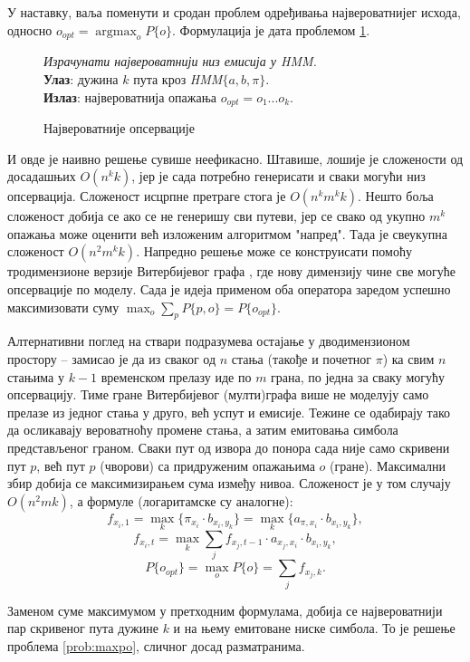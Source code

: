 \documentclass[12pt,oneside]{memoir}
\newenvironment{problem}[1][!ht]
{\renewcommand{\algorithmcfname}{Проблем}
\begin{figure}[!ht]
\centering
  \begin{minipage}{.94\linewidth}
	\begin{algorithm}[#1]%
  }{\end{algorithm}
  \end{minipage}
\end{figure}}
\begin{document}
\begin{CJK}{UTF8}{ipxm}
У наставку, ваља поменути и сродан проблем одређивања највероватнијег исхода, односно $o_{opt} = \operatorname{argmax}_o P\{o\}$. Формулација је дата проблемом \ref{prob:maxops}.

\begin{problem}[H]
  \SetAlgoLined
  \textit{Израчунати највероватнији низ емисија у \textit{HMM}.}\\
  \textbf{Улаз}: дужина $k$ пута кроз \textit{HMM}$\{a, b, \pi\}$.\\
  \textbf{Излаз}: највероватнија опажања $o_{opt} = o_1...o_k$.
  \caption{Највероватније опсервације}
  \label{prob:maxops}
\end{problem}

И овде је наивно решење сувише неефикасно. Штавише, лошије је сложености од досадашњих $O(n^k k)$, јер је сада потребно генерисати и сваки могући низ опсервација. Сложеност исцрпне претраге стога је $O(n^k m^k k)$. Нешто боља сложеност добија се ако се не генеришу сви путеви, јер се свако од укупно $m^k$ опажања може оценити већ изложеним алгоритмом "напред". Тада је свеукупна сложеност $O(n^2 m^k k)$. Напредно решење може се конструисати помоћу тродимензионе верзије Витербијевог графа \cite{compeau2015}, где нову димензију чине све могуће опсервације по моделу. Сада је идеја применом оба оператора заредом успешно максимизовати суму $\max_o \sum_p P\{p, o\} = P\{o_{opt}\}$.

Алтернативни поглед на ствари подразумева остајање у дводимензионом простору -- замисао је да из сваког од $n$ стања (такође и почетног $\pi$) ка свим $n$ стањима у $k-1$ временском прелазу иде по $m$ грана, по једна за сваку могућу опсервацију. Тиме гране Витербијевог (мулти)графа више не моделују само прелазе из једног стања у друго, већ успут и емисије. Тежине се одабирају тако да осликавају вероватноћу промене стања, а затим емитовања симбола представљеног граном. Сваки пут од извора до понора сада није само скривени пут $p$, већ пут $p$ (чворови) са придруженим опажањима $o$ (гране). Максимални збир добија се максимизирањем сума између нивоа. Сложеност је у том случају $O(n^2 m k)$, а формуле (логаритамске су аналогне): $$f_{x_i, 1} = \max_k \{\pi_{x_i} \cdot b_{x_i, y_k}\} = \max_k \{a_{\pi, x_i} \cdot b_{x_i, y_k}\},$$ $$f_{x_i, t} = \max_k \sum_j f_{x_j, t-1} \cdot a_{x_j, x_i} \cdot b_{x_i, y_k},$$ $$P\{o_{opt}\} = \max_o P\{o\} = \sum_j f_{x_j, k}.$$

Заменом суме максимумом у претходним формулама, добија се највероватнији пар скривеног пута дужине $k$ и на њему емитоване ниске симбола. То је решење проблема \ref{prob:maxpo}, сличног досад разматранима.


\end{CJK}
\end{document}
